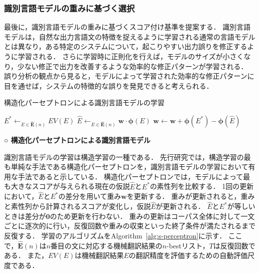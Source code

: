 \documentclass[japanese]{jnlp_1.4}
\newcommand{\argmax}{}
\newcommand{\textcolor}[2]{}
\begin{document}
\subsubsection{識別言語モデルの重みに基づく選択}

最後に，識別言語モデルの重みに基づくスコア付け基準を提案する．
識別言語モデルは，自然な出力言語文の特徴を捉えるように学習される通常の言語モデルとは異なり，ある特定のシステムについて，起こりやすい出力誤りを修正するように学習される．
さらに学習時に正則化を行えば，モデルのサイズが小さくなり，少ない修正で出力を改善するような効率的な修正パターンが学習される．
誤り分析の観点から見ると，モデルによって学習された効率的な修正パターンに目を通せば，システムの特徴的な誤りを発見できると考えられる．

\begin{algorithm}[b]
\caption{構造化パーセプトロンによる識別言語モデルの学習}
\label{alg:s-perceptron}
\begin{algorithmic}
\STATE $E^* \leftarrow \argmax_{E \in \boldsymbol{\hat E}(n)} EV(E)$
\STATE $\hat{E} \leftarrow \argmax_{E \in \boldsymbol{\hat E}(n)} \boldsymbol{w} \cdot \boldsymbol{\phi}(E)$
\STATE $\boldsymbol{w} \leftarrow \boldsymbol{w} + \boldsymbol{\phi}(E^*) - \boldsymbol{\phi}(\hat{E})$
\ENDFOR
\ENDFOR
\end{algorithmic}
\end{algorithm}

\vspace{1\Cvs}
\noindent \textbf{○ 構造化パーセプトロンによる識別言語モデル}

識別言語モデルの学習は構造学習の一種である．
先行研究では，構造学習の最も単純な手法である構造化パーセプトロン\cite{collins02structuredperceptron}を，識別言語モデルの学習において有用な手法であると示している\cite{roark07discriminative}．
構造化パーセプトロンでは，\textcolor{black}{候補集合の中で誤りの修正先として学習される目標$E^*$を定める．本研究では目標として，機械翻訳結果の$n$-bestの中で評価尺度が最も高かった文（オラクル訳，\ref{sec:score-correct-trans}節参照）を選択する．
学習では，}モデルによって最も大きなスコアが与えられる現在の仮説$\hat{E}$と$E^*$の素性列を比較する．
1回の更新において，$\hat{E}$と$E^*$の差分を用いて重み$\boldsymbol{w}$を更新する．
重みが更新されると，重みと素性列から計算されるスコアが変化し，仮説$\hat{E}$が更新される．
$\hat{E}$と$E^*$が等しいときは差分が$\boldsymbol{0}$のため更新を行わない．
重みの更新はコーパス全体に対して一文ごとに逐次的に行い，反復回数や重みの収束といった終了条件が満たされるまで反復する．
学習のアルゴリズムをAlgorithm~\ref{alg:s-perceptron}に示す．
ここで，$\boldsymbol{\hat E}(n)$は$n$番目の文に対応する機械翻訳結果の$n$-bestリスト，$T$は反復回数である．
また，$EV(E)$は機械翻訳結果$E$の翻訳精度を評価するための自動評価尺度である．
\end{document}
